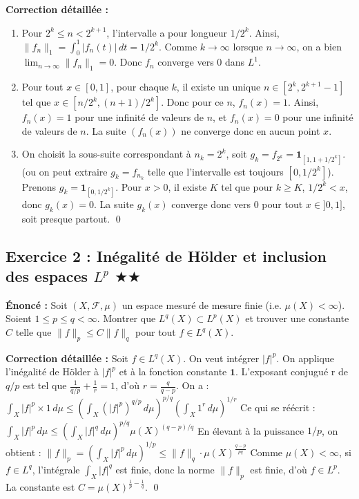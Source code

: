 \documentclass[11pt,a4paper]{article}
\begin{document}
\textbf{Correction détaillée :}
\begin{enumerate}
\item Pour $2^k \le n < 2^{k+1}$, l'intervalle a pour longueur $1/2^k$. Ainsi, $\|f_n\|_1 = \int_0^1 |f_n(t)| \, dt = 1/2^k$. Comme $k \to \infty$ lorsque $n \to \infty$, on a bien $\lim_{n \to \infty} \|f_n\|_1 = 0$. Donc $f_n$ converge vers 0 dans $L^1$.
\item Pour tout $x \in [0,1]$, pour chaque $k$, il existe un unique $n \in [2^k, 2^{k+1}-1]$ tel que $x \in [n/2^k, (n+1)/2^k]$. Donc pour ce $n$, $f_n(x) = 1$. Ainsi, $f_n(x) = 1$ pour une infinité de valeurs de $n$, et $f_n(x) = 0$ pour une infinité de valeurs de $n$. La suite $(f_n(x))$ ne converge donc en aucun point $x$.
\item On choisit la sous-suite correspondant à $n_k = 2^k$, soit $g_k = f_{2^k} = \mathbf{1}_{[1, 1+1/2^k]}$. (ou on peut extraire $g_k = f_{n_k}$ telle que l'intervalle est toujours $[0, 1/2^k]$). Prenons $g_k = \mathbf{1}_{[0, 1/2^k]}$. Pour $x > 0$, il existe $K$ tel que pour $k \ge K$, $1/2^k < x$, donc $g_k(x) = 0$. La suite $g_k(x)$ converge donc vers $0$ pour tout $x \in ]0,1]$, soit presque partout. \qed
\end{enumerate}


\subsection*{Exercice 2 : Inégalité de Hölder et inclusion des espaces $L^p$ \quad $\bigstar\bigstar$}
\textbf{Énoncé :}
Soit $(X, \mathcal{F}, \mu)$ un espace mesuré de mesure finie (i.e. $\mu(X) < \infty$). Soient $1 \le p \le q < \infty$.
Montrer que $L^q(X) \subset L^p(X)$ et trouver une constante $C$ telle que $\|f\|_p \le C \|f\|_q$ pour tout $f \in L^q(X)$.

\textbf{Correction détaillée :}
Soit $f \in L^q(X)$. On veut intégrer $|f|^p$.
On applique l'inégalité de Hölder à $|f|^p$ et à la fonction constante $\mathbf{1}$.
L'exposant conjugué r de $q/p$ est tel que $\frac{1}{q/p} + \frac{1}{r} = 1$, d'où $r = \frac{q}{q-p}$.
On a :
$\int_X |f|^p \times 1 \, d\mu \le \left( \int_X (|f|^p)^{q/p} \, d\mu \right)^{p/q} \left( \int_X 1^r \, d\mu \right)^{1/r}$
Ce qui se réécrit :
$\int_X |f|^p \, d\mu \le \left( \int_X |f|^q \, d\mu \right)^{p/q} \mu(X)^{(q-p)/q}$
En élevant à la puissance $1/p$, on obtient :
$\|f\|_p = \left( \int_X |f|^p \, d\mu \right)^{1/p} \le \|f\|_q \cdot \mu(X)^{\frac{q-p}{pq}}$
Comme $\mu(X) < \infty$, si $f \in L^q$, l'intégrale $\int_X |f|^q$ est finie, donc la norme $\|f\|_p$ est finie, d'où $f \in L^p$.
La constante est $C = \mu(X)^{\frac{1}{p} - \frac{1}{q}}$. \qed
\end{document}

